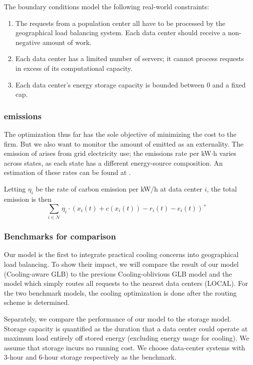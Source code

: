 \documentclass{acm_proc_article-sp}
\newcommand{\carbondioxide}{\ch{CO2}}
\begin{document}
The boundary conditions model the following real-world constraints:
\begin{enumerate}
\item
The requests from a population center all have to be processed by the geographical load balancing system. Each data center should receive a non-negative amount of work.
\item
Each data center has a limited number of servers; it cannot process requests in excess of its computational capacity.
\item
Each data center’s energy storage capacity is bounded between $0$ and a fixed cap.
\end{enumerate}
\subsubsection{\carbondioxide{} emissions}
The optimization thus far has the sole objective of minimizing the cost to the firm. But we also want to monitor the amount of \carbondioxide{} emitted as an externality. The emission of \carbondioxide{} arises from grid electricity use; the emissions rate per kW$\cdot{}$h varies across states, as each state has a different energy-source composition. An estimation of these rates can be found at \cite{carbon}.

Letting $\eta_i$ be the rate of carbon emission per kW/h at data center $i$, the total \carbondioxide{} emission is then
\[\sum_{i \in \mathcal{N}} \eta_i \cdot (x_i(t) + c(x_i(t)) - r_i(t) - e_i(t))^+\]
\subsubsection{Benchmarks for comparison}
Our model is the first to integrate practical cooling concerns into geographical load balancing. To show their impact, we will compare the result of our model (Cooling-aware GLB) to the previous Cooling-oblivious GLB model and the model which simply routes all requests to the nearest data centers (LOCAL). For the two benchmark models, the cooling optimization is done after the routing scheme is determined.

Separately, we compare the performance of our model to the storage model. Storage capacity is quantified as the duration that a data center could operate at maximum load entirely off stored energy (excluding energy usage for cooling). We assume that storage incurs no running cost. We choose data-center systems with 3-hour and 6-hour storage respectively as the benchmark.
\end{document}
